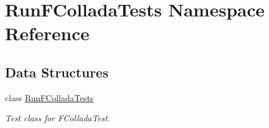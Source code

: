 \hypertarget{namespaceRunFColladaTests}{
\section{RunFColladaTests Namespace Reference}
\label{namespaceRunFColladaTests}
}
\subsection*{Data Structures}
\begin{DoxyCompactItemize}
\item 
class \hyperlink{classRunFColladaTests_1_1RunFColladaTests}{RunFColladaTests}
\begin{DoxyCompactList}\small\item\em Test class for FColladaTest. \item\end{DoxyCompactList}\end{DoxyCompactItemize}
